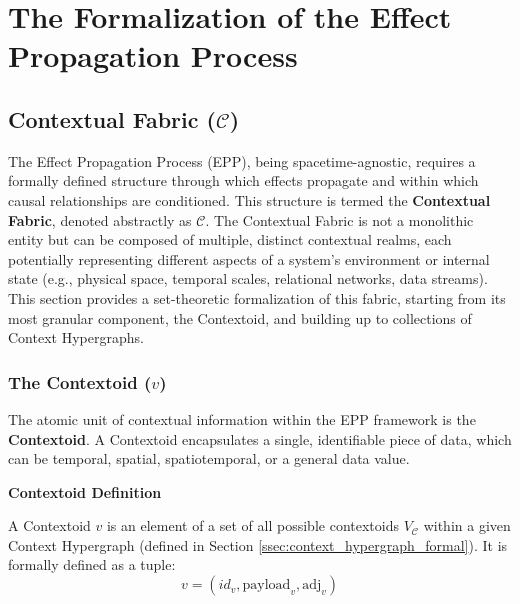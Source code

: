 

\section{The Formalization of the Effect Propagation Process}
\label{sec:formalization}



\subsection[Contextual Fabric (C)]{Contextual Fabric (\(\mathcal{C}\))}
\label{sec:formalization_context}

The Effect Propagation Process (EPP), being spacetime-agnostic, requires a formally defined structure through which effects propagate and within which causal relationships are conditioned. This structure is termed the \textbf{Contextual Fabric}, denoted abstractly as \(\mathcal{C}\). The Contextual Fabric is not a monolithic entity but can be composed of multiple, distinct contextual realms, each potentially representing different aspects of a system's environment or internal state (e.g., physical space, temporal scales, relational networks, data streams). This section provides a set-theoretic formalization of this fabric, starting from its most granular component, the Contextoid, and building up to collections of Context Hypergraphs.

\subsubsection[The Contextoid (v)]{The Contextoid (\(v\))}
\label{ssec:contextoid_formal}

The atomic unit of contextual information within the EPP framework is the \textbf{Contextoid}. A Contextoid encapsulates a single, identifiable piece of data, which can be temporal, spatial, spatiotemporal, or a general data value.

\textbf{Contextoid Definition}

A Contextoid \( v \) is an element of a set of all possible contextoids \( V_{\mathcal{C}} \) within a given Context Hypergraph (defined in Section \ref{ssec:context_hypergraph_formal}). It is formally defined as a tuple:
\[ v = (id_v, \text{payload}_v, \text{adj}_v) \]


